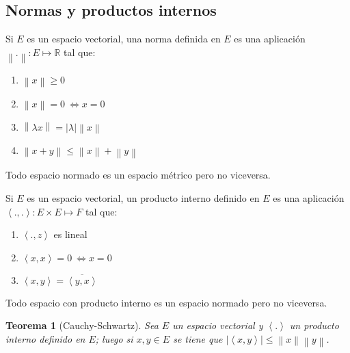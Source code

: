 \documentclass[11pt]{article}
\newcommand{\R}{{\mathbb{R}}}
\newcommand{\norm}[1]{\left\lVert#1\right\rVert}
\newcommand{\abs}[1]{\left\lvert#1\right\rvert}
\newcommand{\ip}[1]{\left\langle#1\right\rangle}
\newtheorem{theorem}{Teorema}
\numberwithin{theorem}{subsection}
\newenvironment{definition}[1][Definici\'on]{\begin{trivlist}
		\item[\hskip \labelsep {\bfseries #1}]}{\end{trivlist}}
\newenvironment{remark}[1][Observaci\'on]{\begin{trivlist}
		\item[\hskip \labelsep {\bfseries #1}]}{\end{trivlist}}
\begin{document}
\subsection{Normas y productos internos}

\begin{definition}
	Si $E$ es un espacio vectorial, una norma definida en $E$ es una aplicaci\'on $\norm{.}: E \mapsto \R$ tal que:
	
	\begin{enumerate}
		\item $\norm{x} \geq 0$
		\item $\norm{x} = 0 \ \Longleftrightarrow x = 0$
		\item $\norm{\lambda x} = \abs{\lambda} \norm{x} $
		\item $\norm{x+y} \leq \norm{x} + \norm{y}$
	\end{enumerate}
	
\end{definition}

\begin{remark}
	Todo espacio normado es un espacio m\'etrico pero no viceversa.
\end{remark}

\begin{definition}
	Si $E$ es un espacio vectorial, un producto interno definido en $E$ es una aplicaci\'on $\ip{.,.}: E \times E \mapsto F$ tal que:
	
	\begin{enumerate}
		\item $\ip{.,z}$ es lineal
		\item $\ip{x,x} = 0 \ \Longleftrightarrow x = 0$
		\item $\ip{x,y} = \overline{\ip{y,x}}$
	\end{enumerate}
	
\end{definition}


\begin{remark}
	Todo espacio con producto interno es un espacio normado pero no viceversa.
\end{remark}

\begin{theorem}[Cauchy-Schwartz]
	\label{Desigualdad de Cauchy-Schwartz }
	Sea $E$ un espacio vectorial y $\ip{.}$ un producto interno definido en $E$; luego si $x,y \in E$ se tiene que $\abs{\ip{x,y}} \leq \norm{x} \norm{y}$.
\end{theorem}
\end{document}
